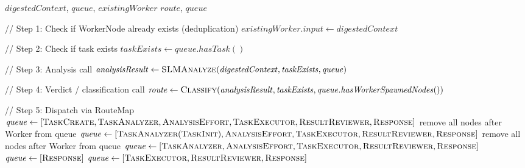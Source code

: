 \documentclass{article}
\begin{document}
\begin{algorithm}[t]
\caption{TINYCUA Worker Node}
\label{alg:worker}
\begin{algorithmic}[1]
\Require $\mathit{digestedContext}$, $\mathit{queue}$, $\mathit{existingWorker}$
\Ensure $\mathit{route}$, $\mathit{queue}$

// Step 1: Check if WorkerNode already exists (deduplication)
    \State $\mathit{existingWorker.input} \gets \mathit{digestedContext}$
    \State \Return
\EndIf

// Step 2: Check if task exists
\State $\mathit{taskExists} \gets \mathit{queue.hasTask()}$

// Step 3: Analysis call
\State $\mathit{analysisResult} \gets \textsc{SLMAnalyze}(\mathit{digestedContext}, \mathit{taskExists}, \mathit{queue})$

// Step 4: Verdict / classification call
\State $\mathit{route} \gets \textsc{Classify}(\mathit{analysisResult}, \mathit{taskExists}, \mathit{queue.hasWorkerSpawnedNodes()})$

// Step 5: Dispatch via RouteMap
    \State $\mathit{queue} \gets [\textsc{TaskCreate}, \textsc{TaskAnalyzer}, \textsc{AnalysisEffort}, \textsc{TaskExecutor}, \textsc{ResultReviewer}, \textsc{Response}]$
    \State remove all nodes after Worker from queue
    \State $\mathit{queue} \gets [\textsc{TaskAnalyzer}(\textsc{TaskInit}), \textsc{AnalysisEffort}, \textsc{TaskExecutor}, \textsc{ResultReviewer}, \textsc{Response}]$
    \State remove all nodes after Worker from queue
    \State $\mathit{queue} \gets [\textsc{TaskAnalyzer}, \textsc{AnalysisEffort}, \textsc{TaskExecutor}, \textsc{ResultReviewer}, \textsc{Response}]$
    \State $\mathit{queue} \gets [\textsc{Response}]$
    \State $\mathit{queue} \gets [\textsc{TaskExecutor}, \textsc{ResultReviewer}, \textsc{Response}]$
\EndIf

\end{algorithmic}
\end{algorithm}
\end{document}
